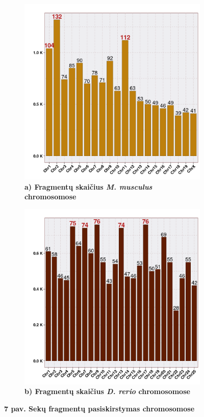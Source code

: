 \documentclass[12pt]{article}
\begin{document}
\begin{figure}[htb]
    \centering
    \begin{subfigure}[b]{0.45\textwidth}
        \centering
        \includegraphics[width=\textwidth]{../Figures/Synteny_Chr_MM.png}
        \caption*{\centering\small\textbf{a) Fragmentų skaičius \emph{M. musculus} chromosomose}}
    \end{subfigure}
    \hfill
    \begin{subfigure}[b]{0.45\textwidth}
        \centering
        \includegraphics[width=\textwidth]{../Figures/Synteny_Chr_DR.png}
        \caption*{\centering\small\textbf{b) Fragmentų skaičius \emph{D. rerio} chromosomose}}
    \end{subfigure}
    \caption*{\small\textbf{7 pav. Sekų fragmentų pasiskirstymas chromosomose}}
    \label{fig:birds}
\end{figure}
\end{document}

